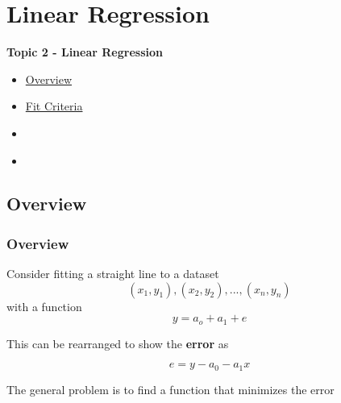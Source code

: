\documentclass[fleqn]{beamer} %
\newcommand{\sectionIItitle}{Linear Regression}
\newcommand{\sectionIsubsectionIVtitle}{}
\newcommand{\sectionIIsubsectionItitle}{Overview}
\newcommand{\sectionIIsubsectionIItitle}{Fit Criteria}
\newcommand{\sectionIIsubsectionIIItitle}{}
\newcommand{\sectionIIsubsectionIVtitle}{}
\begin{document}
			\begin{frame}
				\frametitle{\sectionIsubsectionIVtitle}
				\bigskip


				\btVFill
			\end{frame}


	\section{\sectionIItitle}\label{sectionII}

		\begin{frame}
			\large \textbf{Topic 2 - \sectionIItitle} \vspace{3mm}\\

			\begin{itemize}
				\item \hyperlink{sectionIIsubsectionI}{\sectionIIsubsectionItitle} \vspc %
				\item \hyperlink{sectionIIsubsectionII}{\sectionIIsubsectionIItitle} \vspc %
				\item \hyperlink{sectionIIsubsectionIII}{\sectionIIsubsectionIIItitle} \vspc %
				\item \hyperlink{sectionIIsubsectionIV}{\sectionIIsubsectionIVtitle} \vspc %
			\end{itemize}

		\end{frame}

		\subsection{\sectionIIsubsectionItitle}\label{sectionIIsubsectionI}

			\begin{frame}[label=sectionIIsubsectionI]
				\frametitle{\sectionIIsubsectionItitle}
				\bigskip
        Consider fitting a straight line to a dataset
        \[(x_1, y_1), (x_2, y_2), ..., (x_n,y_n)\] 
        with a function \[y=a_o+a_1+e\]

        This can be rearranged to show the {\bf error} as

        \[e=y-a_0-a_1x\]
  
        The general problem is to find a function that minimizes the error  
  
				\btVFill
			\end{frame}
\end{document}

